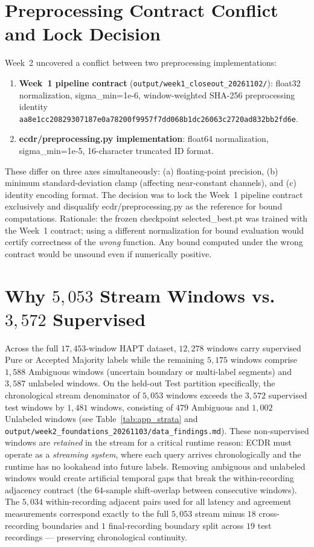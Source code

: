 \documentclass[11pt,oneside,a4paper]{report}
\newcommand{\code}[1]{{\small\upshape\ttfamily #1}}
\newcommand{\pathcode}[1]{{\small\upshape\ttfamily\nolinkurl{#1}}}
\theoremstyle{remark}
\begin{document}
\section{Preprocessing Contract Conflict and Lock Decision}
Week~2 uncovered a conflict between two preprocessing implementations:
\begin{enumerate}[leftmargin=1.5em]
  \item \textbf{Week~1 pipeline contract} (\pathcode{output/week1_closeout_20261102/}): \code{float32} normalization, \code{sigma\_min=1e-6}, window-weighted SHA-256 preprocessing identity \pathcode{aa8e1cc20829307187e0a78200f9957f7dd068b1dc26063c2720ad832bb2fd6e}.
  \item \textbf{\code{ecdr/preprocessing.py} implementation}: \code{float64} normalization, \code{sigma\_min=1e-5}, 16-character truncated ID format.
\end{enumerate}
These differ on three axes simultaneously: (a) floating-point precision, (b) minimum standard-deviation clamp (affecting near-constant channels), and (c) identity encoding format. The decision was to lock the Week~1 pipeline contract exclusively and disqualify \code{ecdr/preprocessing.py} as the reference for bound computations. Rationale: the frozen checkpoint \code{selected\_best.pt} was trained with the Week~1 contract; using a different normalization for bound evaluation would certify correctness of the \emph{wrong} function. Any bound computed under the wrong contract would be unsound even if numerically positive.

\section{Why $5{,}053$ Stream Windows vs.\ $3{,}572$ Supervised}
Across the full $17{,}453$-window HAPT dataset, $12{,}278$ windows carry supervised Pure or Accepted Majority labels while the remaining $5{,}175$ windows comprise $1{,}588$ Ambiguous windows (uncertain boundary or multi-label segments) and $3{,}587$ unlabeled windows. On the held-out Test partition specifically, the chronological stream denominator of $5{,}053$ windows exceeds the $3{,}572$ supervised test windows by $1{,}481$ windows, consisting of $479$ Ambiguous and $1{,}002$ Unlabeled windows (see Table~\ref{tab:app_strata} and \nolinkurl{output/week2_foundations_20261103/data_findings.md}). These non-supervised windows are \emph{retained} in the stream for a critical runtime reason: ECDR must operate as a \emph{streaming system}, where each query arrives chronologically and the runtime has no lookahead into future labels. Removing ambiguous and unlabeled windows would create artificial temporal gaps that break the within-recording adjacency contract (the $64$-sample shift-overlap between consecutive windows). The $5{,}034$ within-recording adjacent pairs used for all latency and agreement measurements correspond exactly to the full $5{,}053$ stream minus $18$ cross-recording boundaries and $1$ final-recording boundary split across $19$ test recordings --- preserving chronological continuity.
\end{document}
